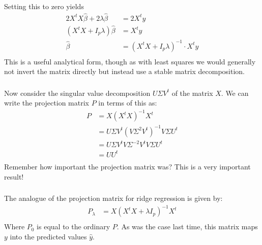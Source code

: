 \begin{frame}[fragile] \frametitle{}

Setting this to zero yields
\begin{align*}
2 X^t X \widehat{\beta} + 2 \lambda \widehat{\beta} &= 2 X^t y \\
(X^t X + I_p \lambda) \widehat{\beta} &=  X^t y \\
\widehat{\beta} &= (X^t X + I_p \lambda)^{-1} \cdot X^t y \\
\end{align*}
\pause This is a useful analytical form, though as with least
squares we would generally not invert the matrix directly but
instead use a stable matrix decomposition.

\end{frame}

\begin{frame}[fragile] \frametitle{}

Now consider the singular value decomposition $U\Sigma V^t$ of
the matrix $X$. We can write the projection matrix $P$ in terms
of this as:
\begin{align*}
P &= X (X^t X)^{-1} X^t \\
&= U \Sigma V^t (V \Sigma^2 V^t)^{-1} V \Sigma U^t \\
&= U \Sigma V^t V \Sigma^{-2} V^t V \Sigma U^t \\
&= U U^t \\
\end{align*}
\pause Remember how important the projection matrix was? This is
a very important result!

\end{frame}

\begin{frame}[fragile] \frametitle{}

The analogue of the projection matrix for ridge regression
is given by:
\begin{align*}
P_{\lambda} &= X (X^t X + \lambda I_p)^{-1} X^t \\
\end{align*}
Where $P_{0}$ is equal to the ordinary $P$. \pause As was
the case last time, this matrix maps $y$ into the predicted
values $\hat{y}$.

\end{frame}

